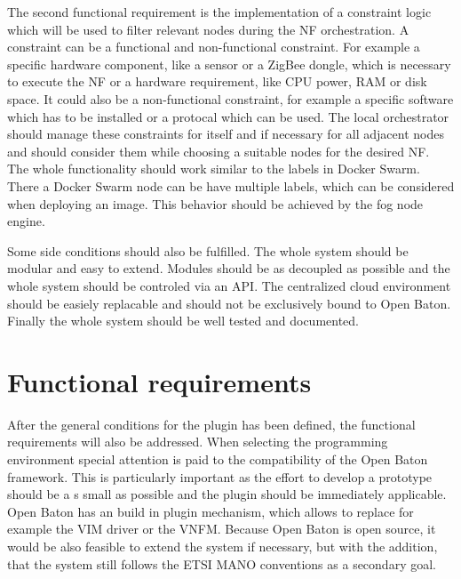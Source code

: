 The second functional requirement is the implementation of a constraint logic which will be used to filter relevant nodes during the \ac{NF} orchestration.
A constraint can be a functional and non-functional constraint.
For example a specific hardware component, like a sensor or a ZigBee dongle, which is necessary to execute the \ac{NF} or a hardware requirement, like \ac{CPU} power, \ac{RAM} or disk space.
It could also be a non-functional constraint, for example a specific software which has to be installed or a protocal which can be used.
The local orchestrator should manage these constraints for itself and if necessary for all adjacent nodes and should consider them while choosing a suitable nodes for the desired \ac{NF}.
The whole functionality should work similar to the labels in Docker Swarm.
There a Docker Swarm node can be have multiple labels, which can be considered when deploying an image.
This behavior should be achieved by the fog node engine.

Some side conditions should also be fulfilled.
The whole system should be modular and easy to extend.
Modules should be as decoupled as possible and the whole system should be controled via an \ac{API}.
The centralized cloud environment should be easiely replacable and should not be exclusively bound to Open Baton.
Finally the whole system should be well tested and documented.


\section{Functional requirements}
After the general conditions for the plugin has been defined, the functional requirements will also be addressed.
When selecting the programming environment special attention is paid to the compatibility of the Open Baton framework.
This is particularly important as the effort to develop a prototype should be a s small as possible and the plugin should be immediately applicable.
Open Baton has an build in plugin mechanism, which allows to replace for example the \ac{VIM} driver or the \ac{VNFM}.
Because Open Baton is open source, it would be also feasible to extend the system if necessary, but with the addition, that the system still follows the \ac{ETSI} \ac{MANO} conventions as a secondary goal.

